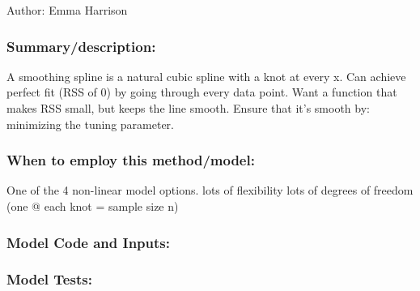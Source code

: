 \documentclass[
]{article}
\newenvironment{Shaded}{\begin{snugshade}}{\end{snugshade}}
\newcommand{\DecValTok}[1]{\textcolor[rgb]{0.00,0.00,0.81}{#1}}
\newcommand{\NormalTok}[1]{#1}
\newcommand{\StringTok}[1]{\textcolor[rgb]{0.31,0.60,0.02}{#1}}
\begin{document}
Author: Emma Harrison

\hypertarget{summarydescription-7}{%
\subsubsection{Summary/description:}\label{summarydescription-7}}

A smoothing spline is a natural cubic spline with a knot at every x. Can
achieve perfect fit (RSS of 0) by going through every data point. Want a
function that makes RSS small, but keeps the line smooth. Ensure that
it's smooth by: minimizing the tuning parameter.

\hypertarget{when-to-employ-this-methodmodel-7}{%
\subsubsection{When to employ this
method/model:}\label{when-to-employ-this-methodmodel-7}}

One of the 4 non-linear model options. lots of flexibility lots of
degrees of freedom (one @ each knot = sample size n)

\hypertarget{model-code-and-inputs-7}{%
\subsubsection{Model Code and Inputs:}\label{model-code-and-inputs-7}}

\begin{Shaded}
\end{Shaded}

\hypertarget{model-tests-7}{%
\subsubsection{Model Tests:}\label{model-tests-7}}
\end{document}
